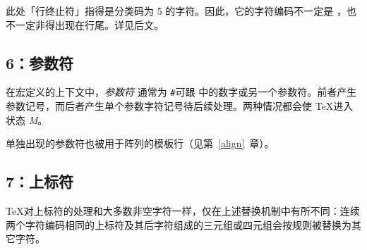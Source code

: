 \documentclass{book}
\begin{document}
此处「行终止符」指得是分类码为 5 的字符。因此，它的字符编码不一定是 ，也不一定非得出现在行尾。详见后文。

\subsection{6：参数符}

在宏定义的上下文中，\emph{参数符} \ldash 通常为 \verb-#-\rdash 可跟  中的数字或另一个参数符。前者产生参数记号，而后者产生单个参数字符记号待后续处理。两种情况都会使 \TeX 进入状态 {\itshape M}。

单独出现的参数符也被用于阵列的模板行（见第~\ref{align}~章）。

\subsection{7：上标符}

\TeX 对上标符的处理和大多数非空字符一样，仅在上述替换机制中有所不同：连续两个字符编码相同的上标符及其后字符组成的三元组或四元组会按规则被替换为其它字符。

\end{document}
